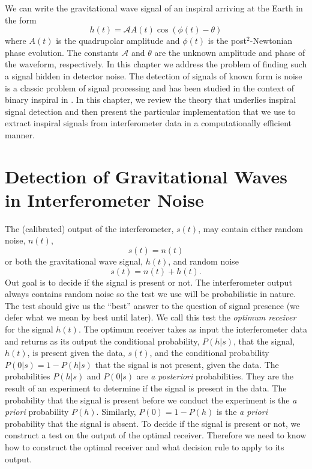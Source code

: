 
We can write the gravitational wave signal of an inspiral arriving at the
Earth in the form
\begin{equation}
h(t) = \mathcal{A} A(t) \cos\left( \phi(t) - \theta \right)
\end{equation}
where $A(t)$ is the quadrupolar amplitude and $\phi(t)$ is the
post$^2$-Newtonian phase evolution. The constants $\mathcal{A}$ and $\theta$ are
the unknown amplitude and phase of the waveform, respectively. In this chapter
we address the problem of finding such a signal hidden in detector noise. The
detection of signals of known form is noise is a classic problem of signal
processing\cite{wainstein:1962} and has been studied in the context of binary
inspiral in \cite{Finn:1992wt,Finn:1992xs}. In this chapter, we review the
theory that underlies inspiral signal detection and then present the particular
implementation that we use to extract inspiral signals from interferometer
data in a computationally efficient manner.

\section{Detection of Gravitational Waves in Interferometer Noise}
\label{s:detectiontheory}

The (calibrated) output of the interferometer, $s(t)$, may contain either
random noise, $n(t)$,
\begin{equation}
s(t) = n(t)
\end{equation}
or both the gravitational wave signal, $h(t)$, and random noise
\begin{equation}
s(t) = n(t) + h(t).
\end{equation}
Out goal is to decide if the signal is present or not. The interferometer
output always contains random noise so the test we use will be probabilistic in
nature. The test should give us the ``best'' answer to the question of signal
presence (we defer what we mean by best until later). We call this test the
\emph{optimum receiver} for the signal $h(t)$. The optimum receiver takes as
input the interferometer data and returns as its output the conditional
probability, $P(h|s)$, that the signal, $h(t)$, is present given the data,
$s(t)$, and the conditional probability $P(0|s) = 1 - P(h|s)$ that the signal
is not present, given the data. The probabilities $P(h|s)$ and $P(0|s)$ are
\emph{a posteriori} probabilities. They are the result of an experiment to
determine if the signal is present in the data. The probability that the
signal is present before we conduct the experiment is the \emph{a priori}
probability $P(h)$. Similarly, $P(0) = 1 - P(h)$ is the \emph{a priori}
probability that the signal is absent. To decide if the signal is present or
not, we construct a test on the output of the optimal receiver. Therefore we
need to know how to construct the optimal receiver and what decision rule to
apply to its output.

